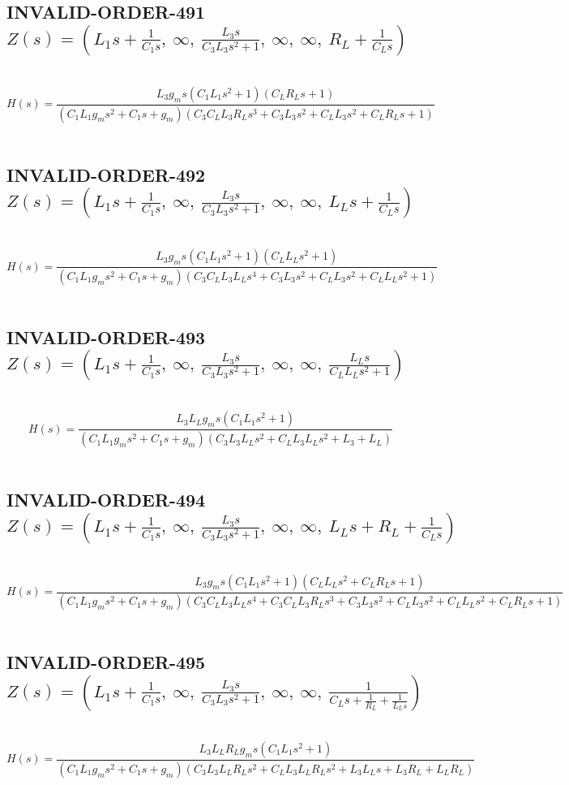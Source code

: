 \documentclass{article}
\begin{document}
\subsection{INVALID-ORDER-491 $Z(s) = \left( L_{1} s + \frac{1}{C_{1} s}, \  \infty, \  \frac{L_{3} s}{C_{3} L_{3} s^{2} + 1}, \  \infty, \  \infty, \  R_{L} + \frac{1}{C_{L} s}\right)$ } \ 
\textbf{\[H(s) = \frac{L_{3} g_{m} s \left(C_{1} L_{1} s^{2} + 1\right) \left(C_{L} R_{L} s + 1\right)}{\left(C_{1} L_{1} g_{m} s^{2} + C_{1} s + g_{m}\right) \left(C_{3} C_{L} L_{3} R_{L} s^{3} + C_{3} L_{3} s^{2} + C_{L} L_{3} s^{2} + C_{L} R_{L} s + 1\right)}\] } \ 
\subsection{INVALID-ORDER-492 $Z(s) = \left( L_{1} s + \frac{1}{C_{1} s}, \  \infty, \  \frac{L_{3} s}{C_{3} L_{3} s^{2} + 1}, \  \infty, \  \infty, \  L_{L} s + \frac{1}{C_{L} s}\right)$ } \ 
\textbf{\[H(s) = \frac{L_{3} g_{m} s \left(C_{1} L_{1} s^{2} + 1\right) \left(C_{L} L_{L} s^{2} + 1\right)}{\left(C_{1} L_{1} g_{m} s^{2} + C_{1} s + g_{m}\right) \left(C_{3} C_{L} L_{3} L_{L} s^{4} + C_{3} L_{3} s^{2} + C_{L} L_{3} s^{2} + C_{L} L_{L} s^{2} + 1\right)}\] } \ 
\subsection{INVALID-ORDER-493 $Z(s) = \left( L_{1} s + \frac{1}{C_{1} s}, \  \infty, \  \frac{L_{3} s}{C_{3} L_{3} s^{2} + 1}, \  \infty, \  \infty, \  \frac{L_{L} s}{C_{L} L_{L} s^{2} + 1}\right)$ } \ 
\textbf{\[H(s) = \frac{L_{3} L_{L} g_{m} s \left(C_{1} L_{1} s^{2} + 1\right)}{\left(C_{1} L_{1} g_{m} s^{2} + C_{1} s + g_{m}\right) \left(C_{3} L_{3} L_{L} s^{2} + C_{L} L_{3} L_{L} s^{2} + L_{3} + L_{L}\right)}\] } \ 
\subsection{INVALID-ORDER-494 $Z(s) = \left( L_{1} s + \frac{1}{C_{1} s}, \  \infty, \  \frac{L_{3} s}{C_{3} L_{3} s^{2} + 1}, \  \infty, \  \infty, \  L_{L} s + R_{L} + \frac{1}{C_{L} s}\right)$ } \ 
\textbf{\[H(s) = \frac{L_{3} g_{m} s \left(C_{1} L_{1} s^{2} + 1\right) \left(C_{L} L_{L} s^{2} + C_{L} R_{L} s + 1\right)}{\left(C_{1} L_{1} g_{m} s^{2} + C_{1} s + g_{m}\right) \left(C_{3} C_{L} L_{3} L_{L} s^{4} + C_{3} C_{L} L_{3} R_{L} s^{3} + C_{3} L_{3} s^{2} + C_{L} L_{3} s^{2} + C_{L} L_{L} s^{2} + C_{L} R_{L} s + 1\right)}\] } \ 
\subsection{INVALID-ORDER-495 $Z(s) = \left( L_{1} s + \frac{1}{C_{1} s}, \  \infty, \  \frac{L_{3} s}{C_{3} L_{3} s^{2} + 1}, \  \infty, \  \infty, \  \frac{1}{C_{L} s + \frac{1}{R_{L}} + \frac{1}{L_{L} s}}\right)$ } \ 
\textbf{\[H(s) = \frac{L_{3} L_{L} R_{L} g_{m} s \left(C_{1} L_{1} s^{2} + 1\right)}{\left(C_{1} L_{1} g_{m} s^{2} + C_{1} s + g_{m}\right) \left(C_{3} L_{3} L_{L} R_{L} s^{2} + C_{L} L_{3} L_{L} R_{L} s^{2} + L_{3} L_{L} s + L_{3} R_{L} + L_{L} R_{L}\right)}\] } \ 
\end{document}
